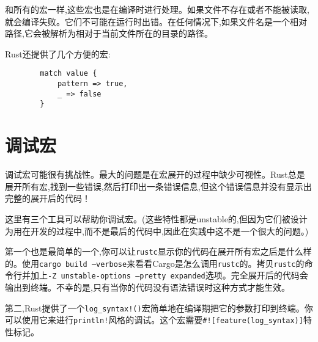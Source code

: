 


和所有的宏一样,这些宏也是在编译时进行处理。如果文件不存在或者不能被读取,就会编译失败。它们不可能在运行时出错。在任何情况下,如果文件名是一个相对路径,它会被解析为相对于当前文件所在的目录的路径。

Rust还提供了几个方便的宏:




\begin{verbatim}
        match value {
            pattern => true,
            _ => false
        }
\end{verbatim}


\section{调试宏}\label{DebugMacro}
调试宏可能很有挑战性。最大的问题是在宏展开的过程中缺少可视性。Rust总是展开所有宏,找到一些错误,然后打印出一条错误信息,但这个错误信息并没有显示出完整的展开后的代码！

这里有三个工具可以帮助你调试宏。(这些特性都是unstable的,但因为它们被设计为用在开发的过程中,而不是最后的代码中,因此在实践中这不是一个很大的问题。)

第一个也是最简单的一个,你可以让\texttt{rustc}显示你的代码在展开所有宏之后是什么样的。使用\texttt{cargo build --verbose}来看看Cargo是怎么调用\texttt{rustc}的。拷贝\texttt{rustc}的命令行并加上\texttt{-Z unstable-options --pretty expanded}选项。完全展开后的代码会输出到终端。不幸的是,只有当你的代码没有语法错误时这种方式才能生效。

第二,Rust提供了一个\texttt{log\_syntax!()}宏简单地在编译期把它的参数打印到终端。你可以使用它来进行\texttt{println!}风格的调试。这个宏需要\texttt{\#![feature(log\_syntax)]}特性标记。

